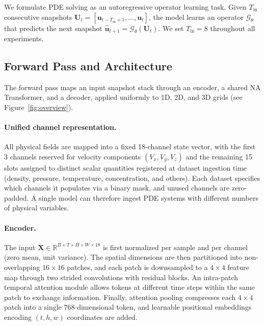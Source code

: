 \documentclass{article}
\begin{document}
We formulate PDE solving as an autoregressive operator learning task. Given $T_{\mathrm{in}}$ consecutive snapshots $\mathbf{U}_t = [\mathbf{u}_{t-T_{\mathrm{in}}+1}, \ldots, \mathbf{u}_t]$, the model learns an operator $\mathcal{G}_\theta$ that predicts the next snapshot $\hat{\mathbf{u}}_{t+1} = \mathcal{G}_\theta(\mathbf{U}_t)$. We set $T_{\mathrm{in}}=8$ throughout all experiments.

\subsection{Forward Pass and Architecture}
\label{sec:architecture}

The forward pass maps an input snapshot stack through an encoder, a shared NA Transformer, and a decoder, applied uniformly to 1D, 2D, and 3D grids (see Figure~\ref{fig:overview}).

\paragraph{Unified channel representation.}
All physical fields are mapped into a fixed 18-channel state vector, with the first 3 channels reserved for velocity components $(V_x, V_y, V_z)$ and the remaining 15 slots assigned to distinct scalar quantities registered at dataset ingestion time (density, pressure, temperature, concentration, and others). Each dataset specifies which channels it populates via a binary mask, and unused channels are zero-padded. A single model can therefore ingest PDE systems with different numbers of physical variables.

\paragraph{Encoder.}
The input $\mathbf{X} \in \mathbb{R}^{B \times T \times H \times W \times 18}$ is first normalized per sample and per channel (zero mean, unit variance). The spatial dimensions are then partitioned into non-overlapping $16 \times 16$ patches, and each patch is downsampled to a $4 \times 4$ feature map through two strided convolutions with residual blocks. An intra-patch temporal attention module allows tokens at different time steps within the same patch to exchange information. Finally, attention pooling compresses each $4 \times 4$ patch into a single 768-dimensional token, and learnable positional embeddings encoding $(t, h, w)$ coordinates are added.
\end{document}

